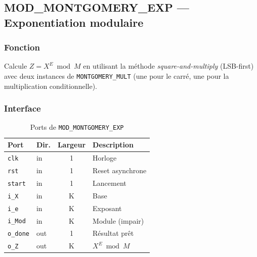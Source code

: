 \subsection{MOD\_MONTGOMERY\_EXP --- Exponentiation modulaire}
\label{sec:mod_exp}

\subsubsection{Fonction}
Calcule $Z = X^E \bmod M$ en utilisant la méthode \textit{square-and-multiply}
(LSB-first) avec deux instances de \texttt{MONTGOMERY\_MULT} (une pour le
carré, une pour la multiplication conditionnelle).

\subsubsection{Interface}
\begin{table}[H]
\centering
\caption{Ports de \texttt{MOD\_MONTGOMERY\_EXP}}
\begin{tabular}{llcp{5cm}}
\toprule
\textbf{Port} & \textbf{Dir.} & \textbf{Largeur} & \textbf{Description} \\
\midrule
\texttt{clk}    & in  & 1 & Horloge \\
\texttt{rst}    & in  & 1 & Reset asynchrone \\
\texttt{start}  & in  & 1 & Lancement \\
\texttt{i\_X}   & in  & K & Base \\
\texttt{i\_e}   & in  & K & Exposant \\
\texttt{i\_Mod} & in  & K & Module (impair) \\
\texttt{o\_done} & out & 1 & Résultat prêt \\
\texttt{o\_Z}    & out & K & $X^E \bmod M$ \\
\bottomrule
\end{tabular}
\end{table}


